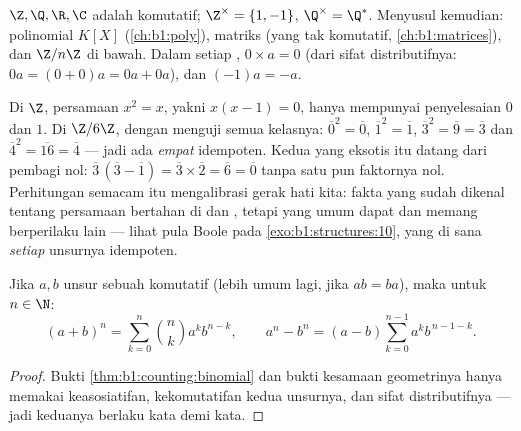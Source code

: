 \begin{example}\label{ex:b1:structures:rings}
$\Z, \Q, \R, \C$ adalah  komutatif; $\Z^\times = \{1, -1\}$,
$\Q^\times = \Q^*$. Menyusul kemudian:  polinomial $K[X]$
(\cref{ch:b1:poly}),  matriks (yang tak komutatif,
\cref{ch:b1:matrices}), dan $\Z/n\Z$ di bawah. Dalam setiap , $0 \times
a = 0$ (dari sifat distributifnya: $0a = (0+0)a = 0a + 0a$), dan
$(-1)a = -a$.
\end{example}

\begin{example}\label{ex:b1:structures:idempotents}
Di $\Z$, persamaan $x^2 = x$, yakni $x(x - 1) = 0$, hanya mempunyai
penyelesaian $0$ dan $1$. Di $\Z/6\Z$, dengan menguji semua kelasnya:
$\overline0^2 = \overline0$, $\overline1^2 = \overline1$,
$\overline3^2 = \overline9 = \overline3$ dan $\overline4^2 =
\overline{16} = \overline4$ --- jadi ada \emph{empat} idempoten. Kedua
yang eksotis itu datang dari pembagi nol: $\overline3\,(\overline3 -
\overline1) = \overline3 \times \overline2 = \overline6 =
\overline0$ tanpa satu pun faktornya nol. Perhitungan semacam itu mengalibrasi
gerak hati kita: fakta yang sudah dikenal tentang persamaan bertahan di
 dan , tetapi  yang umum dapat dan memang
berperilaku lain --- lihat pula  Boole pada
\cref{exo:b1:structures:10}, yang di sana \emph{setiap} unsurnya
idempoten.
\end{example}

\begin{proposition}\label{prop:b1:structures:binomial}
Jika $a, b$ unsur sebuah  komutatif (lebih umum lagi, jika
$ab = ba$), maka untuk $n \in \N$:
\[
(a+b)^n = \sum_{k=0}^n \binom nk a^k b^{n-k},
\qquad
a^n - b^n = (a - b) \sum_{k=0}^{n-1} a^k b^{\,n-1-k} .
\]
\end{proposition}

\begin{proof}
Bukti \cref{thm:b1:counting:binomial} dan bukti kesamaan geometrinya
hanya memakai keasosiatifan, kekomutatifan kedua unsurnya,
dan sifat distributifnya --- jadi keduanya berlaku kata demi kata.
\end{proof}

